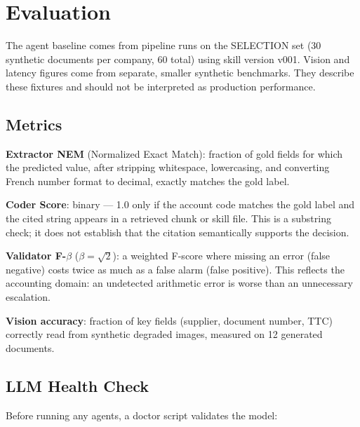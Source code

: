 \section{Evaluation}
\label{sec:evaluation}

The agent baseline comes from pipeline runs on the SELECTION set (30 synthetic
documents per company, 60 total) using skill version v001. Vision and latency
figures come from separate, smaller synthetic benchmarks. They describe these
fixtures and should not be interpreted as production performance.

\subsection{Metrics}

\textbf{Extractor NEM} (Normalized Exact Match): fraction of gold fields for
which the predicted value, after stripping whitespace, lowercasing, and converting
French number format to decimal, exactly matches the gold label.

\textbf{Coder Score}: binary — 1.0 only if the account code matches the gold
label and the cited string appears in a retrieved chunk or skill file. This is a
substring check; it does not establish that the citation semantically supports
the decision.

\textbf{Validator F-$\beta$} ($\beta\!=\!\sqrt{2}$): a weighted F-score where
missing an error (false negative) costs twice as much as a false alarm (false
positive). This reflects the accounting domain: an undetected arithmetic error
is worse than an unnecessary escalation.

\textbf{Vision accuracy}: fraction of key fields (supplier, document number, TTC)
correctly read from synthetic degraded images, measured on 12 generated
documents.

\subsection{LLM Health Check}

Before running any agents, a doctor script validates the model:


